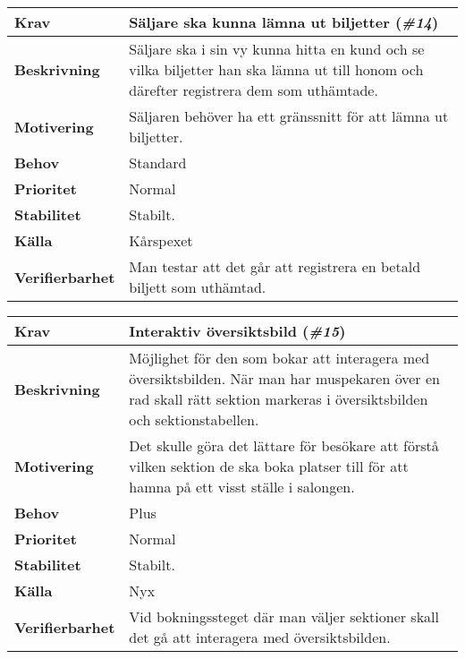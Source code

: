 \documentclass[a4paper, twoside, 11pt, titlepage]{article}
\begin{document}
	\begin{tabular} { p{2.6cm} p{12.5cm} }
		\hline
		\sffamily\textbf{Krav} & Säljare ska kunna lämna ut biljetter (\emph{\#14})  \\
		\hline
		\sffamily\textbf{Beskrivning} & Säljare ska i sin vy kunna hitta en kund och se vilka biljetter han ska lämna ut till honom och därefter registrera dem som uthämtade.  \\
		\hline
		\sffamily\textbf{Motivering} & Säljaren behöver ha ett gränssnitt för att lämna ut biljetter.  \\
		\hline
		\sffamily\textbf{Behov} & Standard  \\
		\hline
		\sffamily\textbf{Prioritet} & Normal  \\
		\hline
		\sffamily\textbf{Stabilitet} & Stabilt.  \\
		\hline
		\sffamily\textbf{Källa} & Kårspexet  \\
		\hline
		\sffamily\textbf{Verifierbarhet} & Man testar att det går att registrera en betald biljett som uthämtad.   \\
		\hline
	\end{tabular}
	\vspace{6mm}

	\begin{tabular} { p{2.6cm} p{12.5cm} }
		\hline
		\sffamily\textbf{Krav} & Interaktiv översiktsbild (\emph{\#15})  \\
		\hline
		\sffamily\textbf{Beskrivning} & Möjlighet för den som bokar att interagera med översiktsbilden. När man har muspekaren över en rad skall rätt sektion markeras i översiktsbilden och sektionstabellen.  \\
		\hline
		\sffamily\textbf{Motivering} & Det skulle göra det lättare för besökare att förstå vilken sektion de ska boka platser till för att hamna på ett visst ställe i salongen.  \\
		\hline
		\sffamily\textbf{Behov} & Plus  \\
		\hline
		\sffamily\textbf{Prioritet} & Normal  \\
		\hline
		\sffamily\textbf{Stabilitet} & Stabilt.  \\
		\hline
		\sffamily\textbf{Källa} & Nyx  \\
		\hline
		\sffamily\textbf{Verifierbarhet} & Vid bokningssteget där man väljer sektioner skall det gå att interagera med översiktsbilden.   \\
		\hline
	\end{tabular}
	\vspace{6mm}
\end{document}
